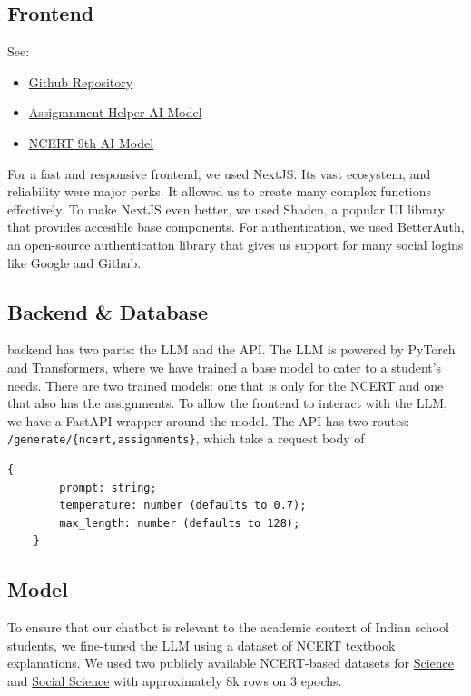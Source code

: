 \documentclass[9pt,a4paper,twocolumn,twoside]{tau-class/tau}
\begin{document}
\subsection{Frontend}
\begin{info}
	See: \begin{itemize}
		\item \href{https://github.com/jayanaxhf}{Github Repository}
		\item \href{https://huggingface.co/JayanAXHF/Assignments_Helper}{Assigmnment Helper AI Model}
		\item \href{https://huggingface.co/JayanAXHF/NCERT_9th_Sc_Ssc}{NCERT 9th AI Model}
	\end{itemize}
	\vspace{5pt}

\end{info}

For a fast and responsive frontend, we used NextJS. Its vast ecosystem, and reliability were major perks. It allowed us to create many complex functions effectively. To make NextJS even better, we used Shadcn, a popular UI library that provides accesible base components. For authentication, we used BetterAuth, an open-source authentication library that gives us support for many social logins like Google and Github.

\subsection{Backend \& Database}
backend has two parts: the LLM and the API. The LLM is powered by PyTorch and Transformers, where we have trained a base model to cater to a student's needs. There are two trained models: one that is only for the NCERT and one that also has the assignments. To allow the frontend to interact with the LLM, we have a FastAPI wrapper around the model. The API has two routes: \verb|/generate/{ncert,assignments}|, which take a request body of \begin{lstlisting}[language=TeX, caption=Request Body for /generate/*]
	{
		prompt: string;
		temperature: number (defaults to 0.7);
		max_length: number (defaults to 128);
	}
\end{lstlisting}
\subsection{Model}
To ensure that our chatbot is relevant to the academic context of Indian school students, we fine-tuned the LLM using a dataset of NCERT textbook explanations. We used two publicly available NCERT-based datasets for \href{https://huggingface.co/datasets/KadamParth/NCERT_Science_9th}{Science} and \href{https://huggingface.co/datasets/KadamParth/NCERT_Social_Studies_9th}{Social Science} with approximately 8k rows on 3 epochs.
\end{document}
